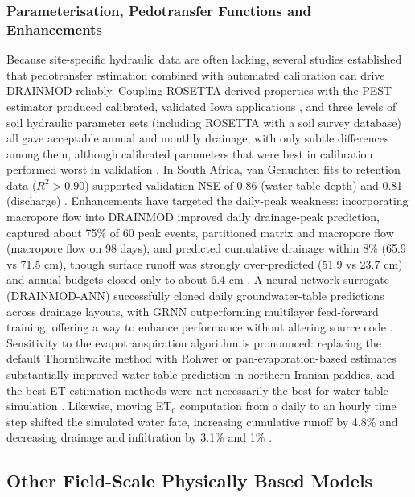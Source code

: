 \documentclass[11pt]{article}
\begin{document}
\subsubsection{Parameterisation, Pedotransfer Functions and Enhancements}

Because site-specific hydraulic data are often lacking, several studies established that pedotransfer estimation combined with automated calibration can drive \textsc{DRAINMOD} reliably. Coupling ROSETTA-derived properties with the PEST estimator produced calibrated, validated Iowa applications \parencite{Singh2006b}, and three levels of soil hydraulic parameter sets (including ROSETTA with a soil survey database) all gave acceptable annual and monthly drainage, with only subtle differences among them, although calibrated parameters that were best in calibration performed worst in validation \parencite{Qi2015}. In South Africa, van Genuchten fits to retention data ($R^2>0.90$) supported validation NSE of 0.86 (water-table depth) and 0.81 (discharge) \parencite{Malota2024,Malota2015}. Enhancements have targeted the daily-peak weakness: incorporating macropore flow into \textsc{DRAINMOD} improved daily drainage-peak prediction, captured about 75\% of 60 peak events, partitioned matrix and macropore flow (macropore flow on 98 days), and predicted cumulative drainage within 8\% (65.9 vs 71.5 cm), though surface runoff was strongly over-predicted (51.9 vs 23.7 cm) and annual budgets closed only to about 6.4 cm \parencite{Askar2020}. A neural-network surrogate (\textsc{DRAINMOD-ANN}) successfully cloned daily groundwater-table predictions across drainage layouts, with GRNN outperforming multilayer feed-forward training, offering a way to enhance performance without altering source code \parencite{Awad2022,Awad2022b}. Sensitivity to the evapotranspiration algorithm is pronounced: replacing the default Thornthwaite method with Rohwer or pan-evaporation-based estimates substantially improved water-table prediction in northern Iranian paddies, and the best ET-estimation methods were not necessarily the best for water-table simulation \parencite{Malakshahi2020}. Likewise, moving ET$_0$ computation from a daily to an hourly time step shifted the simulated water fate, increasing cumulative runoff by 4.8\% and decreasing drainage and infiltration by 3.1\% and 1\% \parencite{Awad2022b}.

\subsection{Other Field-Scale Physically Based Models}
\end{document}
